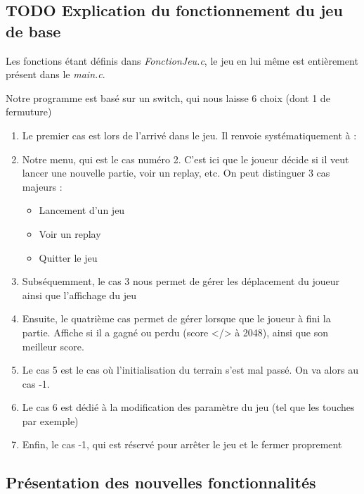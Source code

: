 \documentclass[letter]{article}
\begin{document}
\subsection{{\bfseries\sffamily TODO} Explication du fonctionnement du jeu de base}
\label{sec:orge1d658f}

Les fonctions étant définis dans \emph{FonctionJeu.c}, le jeu en lui même est entièrement présent dans le \emph{main.c}.

Notre programme est basé sur un switch, qui nous laisse 6 choix (dont 1 de fermuture)

\begin{enumerate}
\item Le premier cas est lors de l'arrivé dans le jeu. Il renvoie systématiquement à :
\item Notre menu, qui est le cas numéro 2. C'est ici que le joueur décide si il veut lancer une nouvelle partie, voir un replay, etc. On peut distinguer 3 cas majeurs :
\begin{itemize}
\item Lancement d'un jeu
\item Voir un replay
\item Quitter le jeu
\end{itemize}
\item Subséquemment, le cas 3 nous permet de gérer les déplacement du joueur ainsi que l’affichage du jeu
\item Ensuite, le quatrième cas permet de gérer lorsque que le joueur à fini la partie. Affiche si il a gagné ou perdu (score </> à 2048), ainsi que son meilleur score.
\item Le cas 5 est le cas où l'initialisation du terrain s'est mal passé. On va alors au cas -1.
\item Le cas 6 est dédié à la modification des paramètre du jeu (tel que les touches par exemple)
\item Enfin, le cas -1, qui est réservé pour arrêter le jeu et le fermer proprement
\end{enumerate}

\subsection{Présentation des nouvelles fonctionnalités}
\label{sec:orga39c03f}
\end{document}
